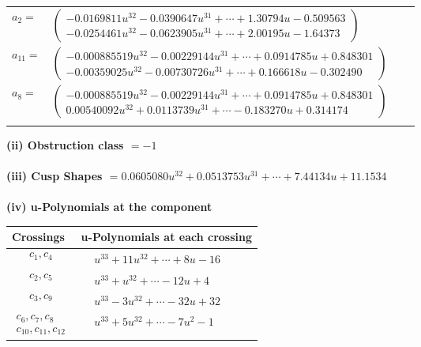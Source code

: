 \documentclass[1p]{elsarticle_modified}
\theoremstyle{definition}
\begin{document}
\begin{tabular}{m{7pt} m{180pt} m{7pt} m{180pt} }
\flushright $a_{2}=$&$\begin{pmatrix}-0.0169811 u^{32}-0.0390647 u^{31}+\cdots+1.30794 u-0.509563\\-0.0254461 u^{32}-0.0623905 u^{31}+\cdots+2.00195 u-1.64373\end{pmatrix}$ \\
\flushright $a_{11}=$&$\begin{pmatrix}-0.000885519 u^{32}-0.00229144 u^{31}+\cdots+0.0914785 u+0.848301\\-0.00359025 u^{32}-0.00730726 u^{31}+\cdots+0.166618 u-0.302490\end{pmatrix}$ \\
\flushright $a_{8}=$&$\begin{pmatrix}-0.000885519 u^{32}-0.00229144 u^{31}+\cdots+0.0914785 u+0.848301\\0.00540092 u^{32}+0.0113739 u^{31}+\cdots-0.183270 u+0.314174\end{pmatrix}$\\&\end{tabular}
\flushleft \textbf{(ii) Obstruction class $= -1$}\\~\\
\flushleft \textbf{(iii) Cusp Shapes $= 0.0605080 u^{32}+0.0513753 u^{31}+\cdots+7.44134 u+11.1534$}\\~\\
\newpage\renewcommand{\arraystretch}{1}
\flushleft \textbf{(iv) u-Polynomials at the component}\newline \\
\begin{tabular}{m{50pt}|m{274pt}}
Crossings & \hspace{64pt}u-Polynomials at each crossing \\
\hline $$\begin{aligned}c_{1},c_{4}\end{aligned}$$&$\begin{aligned}
&u^{33}+11 u^{32}+\cdots+8 u-16
\end{aligned}$\\
\hline $$\begin{aligned}c_{2},c_{5}\end{aligned}$$&$\begin{aligned}
&u^{33}+u^{32}+\cdots-12 u+4
\end{aligned}$\\
\hline $$\begin{aligned}c_{3},c_{9}\end{aligned}$$&$\begin{aligned}
&u^{33}-3 u^{32}+\cdots-32 u+32
\end{aligned}$\\
\hline $$\begin{aligned}c_{6},c_{7},c_{8}\\c_{10},c_{11},c_{12}\end{aligned}$$&$\begin{aligned}
&u^{33}+5 u^{32}+\cdots-7 u^2-1
\end{aligned}$\\
\hline
\end{tabular}\\~\\
\end{document}
